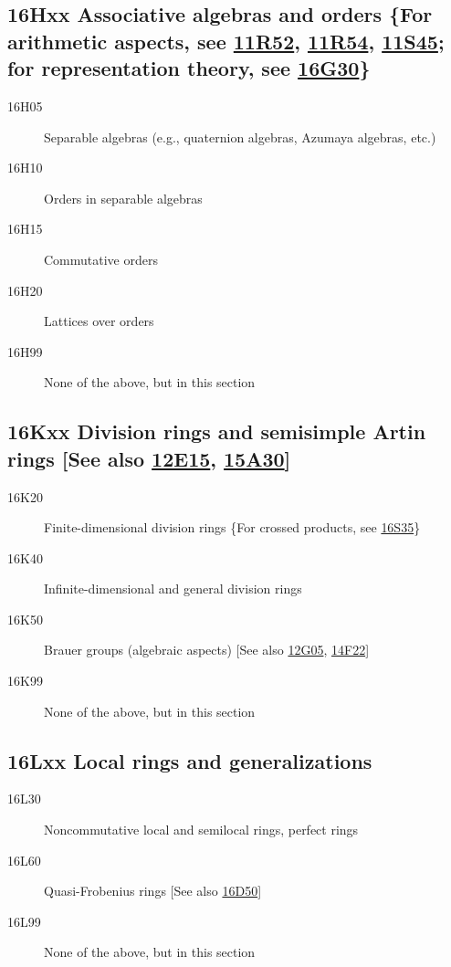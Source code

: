 \documentclass[letterpaper]{article}
\begin{document}
\subsection*{16Hxx  Associative algebras and orders \{For arithmetic aspects, see \hyperref[11R52]{11R52}, \hyperref[11R54]{11R54}, \hyperref[11S45]{11S45}; for representation theory, see \hyperref[16G30]{16G30}\} }\label{16Hxx}
\begin{description}  
\item [16H05]\label{16H05} Separable algebras (e.g., quaternion algebras, Azumaya algebras, etc.)
\item [16H10]\label{16H10} Orders in separable algebras
\item [16H15]\label{16H15} Commutative orders
\item [16H20]\label{16H20} Lattices over orders
\item [16H99]\label{16H99} None of the above, but in this section
\end{description}
\subsection*{16Kxx  Division rings and semisimple Artin rings [See also \hyperref[12E15]{12E15}, \hyperref[15A30]{15A30}] }\label{16Kxx}
\begin{description}  
\item [16K20]\label{16K20} Finite-dimensional division rings \{For crossed products, see \hyperref[16S35]{16S35}\}
\item [16K40]\label{16K40} Infinite-dimensional and general division rings
\item [16K50]\label{16K50} Brauer groups (algebraic aspects) [See also \hyperref[12G05]{12G05}, \hyperref[14F22]{14F22}]
\item [16K99]\label{16K99} None of the above, but in this section
\end{description}
\subsection*{16Lxx  Local rings and generalizations }\label{16Lxx}
\begin{description}  
\item [16L30]\label{16L30} Noncommutative local and semilocal rings, perfect rings
\item [16L60]\label{16L60} Quasi-Frobenius rings [See also \hyperref[16D50]{16D50}]
\item [16L99]\label{16L99} None of the above, but in this section
\end{description}
\end{document}
